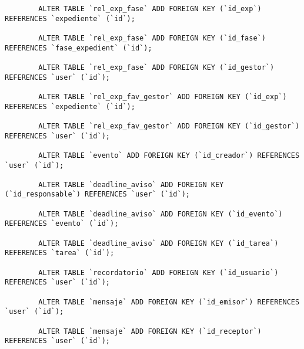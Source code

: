 \begin{verbatim}
		ALTER TABLE `rel_exp_fase` ADD FOREIGN KEY (`id_exp`) REFERENCES `expediente` (`id`);
		
		ALTER TABLE `rel_exp_fase` ADD FOREIGN KEY (`id_fase`) REFERENCES `fase_expedient` (`id`);
		
		ALTER TABLE `rel_exp_fase` ADD FOREIGN KEY (`id_gestor`) REFERENCES `user` (`id`);
		
		ALTER TABLE `rel_exp_fav_gestor` ADD FOREIGN KEY (`id_exp`) REFERENCES `expediente` (`id`);
		
		ALTER TABLE `rel_exp_fav_gestor` ADD FOREIGN KEY (`id_gestor`) REFERENCES `user` (`id`);
		
		ALTER TABLE `evento` ADD FOREIGN KEY (`id_creador`) REFERENCES `user` (`id`);
		
		ALTER TABLE `deadline_aviso` ADD FOREIGN KEY (`id_responsable`) REFERENCES `user` (`id`);
		
		ALTER TABLE `deadline_aviso` ADD FOREIGN KEY (`id_evento`) REFERENCES `evento` (`id`);
		
		ALTER TABLE `deadline_aviso` ADD FOREIGN KEY (`id_tarea`) REFERENCES `tarea` (`id`);
		
		ALTER TABLE `recordatorio` ADD FOREIGN KEY (`id_usuario`) REFERENCES `user` (`id`);
		
		ALTER TABLE `mensaje` ADD FOREIGN KEY (`id_emisor`) REFERENCES `user` (`id`);
		
		ALTER TABLE `mensaje` ADD FOREIGN KEY (`id_receptor`) REFERENCES `user` (`id`);
		
	\end{verbatim}


		
